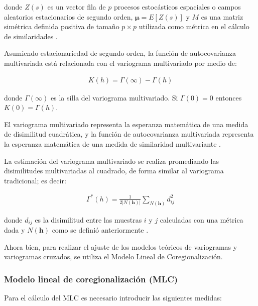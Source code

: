 \documentclass[
]{book}
\begin{document}
donde \(Z(s)\) es un vector fila de \(p\) procesos estocásticos espaciales o campos aleatorios estacionarios de segundo orden, \(\boldsymbol \mu=E[Z(s)]\) y \(M\) es una matriz simétrica definida positiva de tamaño \(p\times p\) utilizada como métrica en el cálculo de similaridades \citep{borou}.

Asumiendo estacionariedad de segundo orden, la función de autocovarianza multivariada está relacionada con el variograma multivariado por medio de:

\begin{align}
    K(h)=\Gamma(\infty)-\Gamma(h)
\end{align}

donde \(\Gamma(\infty)\) es la silla del variograma multivariado. Si \(\Gamma(0)=0\) entonces \(K(0)=\Gamma(h)\).

El variograma multivariado representa la esperanza matemática de una medida de disimilitud cuadrática, y la función de autocovarianza multivariada representa la esperanza matemática de una medida de similaridad multivariante \citep{borou}.

La estimación del variograma multivariado se realiza promediando las disimilitudes multivariadas al cuadrado, de forma similar al variograma tradicional; es decir:

\begin{align}
    \Gamma^*(h)=\frac{1}{2|N(\textbf{h})|}\sum_{N(\textbf{h})}d_{ij}^2
\end{align}

donde \(d_{ij}\) es la disimilitud entre las muestras \(i\) y \(j\) calculadas con una métrica dada y \(N(\textbf{h})\) como se definió anteriormente \citep{borou}.

Ahora bien, para realizar el ajuste de los modelos teóricos de variogramas y variogramas cruzados, se utiliza el Modelo Lineal de Coregionalización.

\hypertarget{modelo-lineal-de-coregionalizaciuxf3n-mlc}{%
\subsubsection*{Modelo lineal de coregionalización (MLC)}\label{modelo-lineal-de-coregionalizaciuxf3n-mlc}}

Para el cálculo del MLC es necesario introducir las siguientes medidas:
\end{document}

